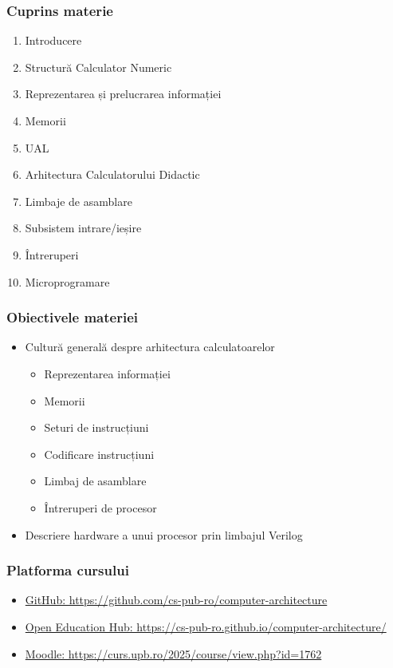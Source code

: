 \begin{frame}
    \frametitle{Cuprins materie}
    \begin{enumerate}
        \setcounter{enumi}{0}
        \item Introducere
        \item Structură Calculator Numeric
        \item Reprezentarea și prelucrarea informației
        \item Memorii
        \item UAL
        \item Arhitectura Calculatorului Didactic
        \item Limbaje de asamblare
        \item Subsistem intrare/ieșire
        \item Întreruperi
        \item Microprogramare
    \end{enumerate}
\end{frame}
    
\begin{frame}
    \frametitle{Obiectivele materiei}
    
    \begin{itemize}
        \item Cultură generală despre arhitectura calculatoarelor
        \begin{itemize}
            \item Reprezentarea informației
            \item Memorii
            \item Seturi de instrucțiuni
            \item Codificare instrucțiuni
            \item Limbaj de asamblare
            \item Întreruperi de procesor
        \end{itemize}
        \item Descriere hardware a unui procesor prin limbajul Verilog
    \end{itemize}
\end{frame}




\begin{frame}
    \frametitle{Platforma cursului}
    
    \begin{itemize}
        \item \href{https://github.com/cs-pub-ro/computer-architecture}{GitHub: https://github.com/cs-pub-ro/computer-architecture}
        \item \href{https://cs-pub-ro.github.io/computer-architecture/}{Open Education Hub: https://cs-pub-ro.github.io/computer-architecture/}
        \item \href{https://curs.upb.ro/2025/course/view.php?id=1762}{Moodle: https://curs.upb.ro/2025/course/view.php?id=1762}
    \end{itemize}
\end{frame}